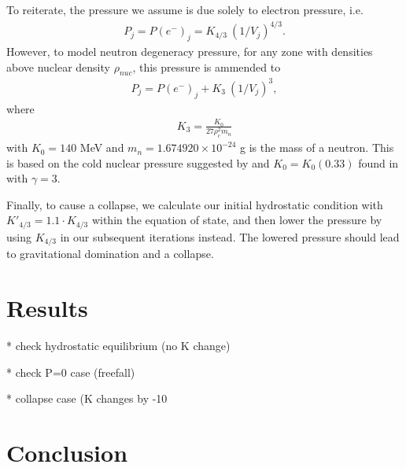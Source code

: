 \documentclass[12pt]{article}
\begin{document}
To reiterate, the pressure we assume is due solely to electron pressure, i.e.
$$
\begin{aligned}
P_j = P(e^-)_j = K_{4/3}\ (1 / V_j)^{4/3}.
\end{aligned}
$$
However, to model neutron degeneracy pressure, for any zone with densities
above nuclear density $\rho_{nuc}$, this pressure is ammended to
$$
\begin{aligned}
P_j = P(e^-)_j + K_3\ (1 / V_j)^3,
\end{aligned}
$$
where
$$
\begin{aligned}
K_3 = \frac{K_0}{27 \rho_c^2 m_n}
\end{aligned}
$$
with $K_0 = 140$ MeV and $m_n = 1.674920 \times 10^{-24}$ g is the mass of a
neutron. This is based on the cold nuclear pressure suggested by and
$K_0 = K_0(0.33)$ found in \citet{bck85} with $\gamma = 3$.

Finally, to cause a collapse, we calculate our initial hydrostatic condition
with $K'_{4/3} = 1.1 \cdot K_{4/3}$ within the equation of state, and then
lower the pressure by using $K_{4/3}$ in our subsequent iterations instead. The
lowered pressure should lead to gravitational domination and a collapse.


\section{Results}

* check hydrostatic equilibrium (no K change)

* check P=0 case (freefall)

* collapse case (K changes by -10%

\section{Conclusion}




\end{document}
